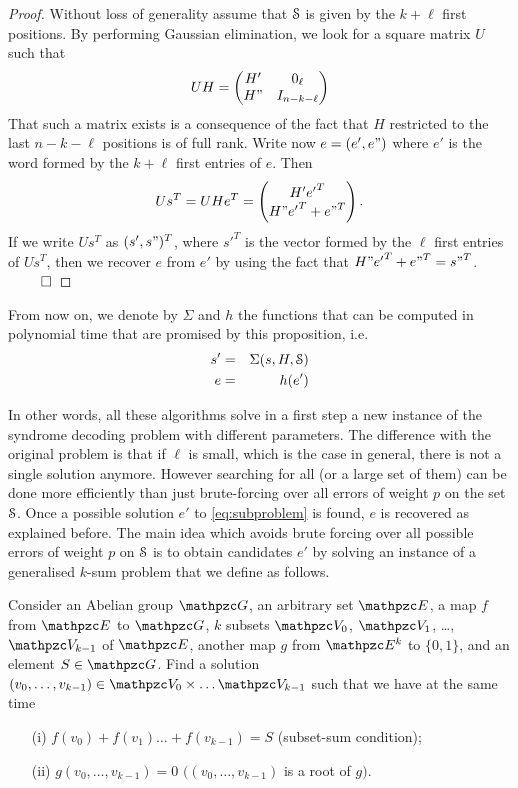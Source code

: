 \begin{proof}
Without loss 
of generality assume that $\mathcal{S}$ is given by the $k+\ell$ first positions.  By performing Gaussian elimination, we look for a square matrix $U$ such that 
$$
U H = \begin{pmatrix} H' & 0_\ell \\
H" & I_{n-k-\ell}\end{pmatrix}
$$
That such a matrix exists is a consequence of the fact that $H$ restricted to the last $n-k-\ell$ positions is of full rank.
Write now $e=(e',e")$ where $e'$ is the word formed by the $k+\ell$ first entries of $e$. Then
$$Us^T=UHe^T = \begin{pmatrix} H'{e'}^T \\ H"{e'}^T + {e"}^T \end{pmatrix}.$$
If we write $Us^T$ as $(s',s")^T$, where $s'^T$ is the vector formed by the $\ell$ first entries 
of $Us^T$, then we recover $e$ from $e'$
by using the fact that $H"{e'}^T + {e"}^T={s"}^T$. $~\qed$
\end{proof}
 From now on, we denote by $\Sigma$ and $h$ the functions that can be computed in polynomial time that are promised by this proposition, i.e.
\begin{eqnarray*}
s ' & = & \Sigma(s,H,\mathcal{S})\\
e & = & h(e')
\end{eqnarray*}

In other words, all these algorithms  solve in a first step a new instance of the syndrome decoding problem with different parameters. The difference
with the original problem is that if $\ell$ is small, which is the case in general, there is not a single solution anymore. 
However searching for all (or a large set of them) can be done more efficiently than just brute-forcing over all errors of weight $p$ on the set $\mathcal{S}$.
Once a possible solution $e'$ to \eqref{eq:subproblem} is found, $e$ is recovered as explained before. 
The main idea which avoids brute forcing over all possible errors of weight $p$ on $\mathcal{S}$ is to obtain candidates $e'$ by solving an instance of a
generalised $k$-sum problem that we define as follows.
\begin{problem}
Consider an Abelian group $\zG$, an arbitrary set $\zE$, a map $f$ from $\zE$ to $\zG$, $k$ subsets $\zV_0$, $\zV_1$, \dots, $\zV_{k-1}$ of $\zE$, another map $g$ from $\zE^k$ to $\{0,1\}$,  and an element $S \in \zG$.
 Find
a  solution $(v_0,\dots,v_{k-1}) \in \zV_0\times \dots \zV_{k-1}$ such that we have at the same time
\begin{itemize}
\item[(i)] $f(v_0) + f(v_1) \dots + f(v_{k-1}) = S$ (subset-sum condition);
\item[(ii)] $g(v_0,\dots,v_{k-1})  =  0$   $((v_0,\dots,v_{k-1})$ is a root of $g)$.
\end{itemize}
\end{problem}

